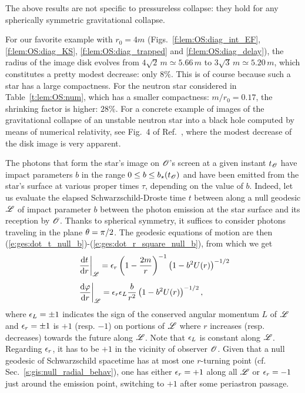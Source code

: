 \begin{remark}
The above results are not specific to pressureless collapse: they
hold for any spherically symmetric gravitational collapse.
\end{remark}

\begin{example}
For our favorite example with $r_0 = 4m$ (Figs.~\ref{f:lem:OS:diag_int_EF},
\ref{f:lem:OS:diag_KS}, \ref{f:lem:OS:diag_trapped} and \ref{f:lem:OS:diag_delay}),
the radius of the image disk evolves from $4\sqrt{2} \, m\simeq 5.66\, m$ to
$3\sqrt{3}\, m \simeq 5.20\, m$, which constitutes a pretty modest
decrease: only $8\%$. This is of course because such a star has a large compactness.
For the neutron star considered in Table~\ref{t:lem:OS:num}, which has a
smaller compactness: $m/r_0 = 0.17$, the shrinking factor is higher: $28\%$.
For a concrete example of images of the gravitational collapse of an unstable neutron star into a black hole computed by means of numerical relativity, see
Fig.~4 of Ref.~\cite{VinceGN12}, where the modest decrease of the disk image
is very apparent.
\end{example}

The photons that form the star's image
on $\mathscr{O}$'s screen at a given instant $t_{\mathscr{O}}$ have impact parameters $b$ in
the range $0\leq b \leq b_\star(t_{\mathscr{O}})$ and have been emitted from the
star's surface at various proper times $\tau$, depending on the value of $b$.
Indeed, let us evaluate the elapsed
Schwarzschild-Droste time $t$ between
along a null geodesic $\mathscr{L}$ of impact parameter $b$ between
the photon emission at the star surface and its reception
by $\mathscr{O}$. Thanks to spherical
symmetry, it suffices to consider photons traveling in the plane
$\theta=\pi/2$. The geodesic equations of motion are then
(\ref{e:ges:dot_t_null_b})-(\ref{e:ges:dot_r_square_null_b}), from which
we get
\begin{subequations}
\begin{align}
   &\left. \frac{\mathrm{d} t}{\mathrm{d} r} \right| _{\mathscr{L}}
    = \epsilon_r \left(1 - \frac{2m}{r} \right) ^{-1}
        \left( 1 - b^2 U(r) \right) ^{-1/2} \\[1ex] \label{e:lem:OS:dtdr_null_geod}
   &\left. \frac{\mathrm{d} \varphi}{\mathrm{d} r} \right| _{\mathscr{L}}
    = \epsilon_r \epsilon_L \frac{b}{r^2} \left( 1 - b^2 U(r) \right) ^{-1/2} ,
\end{align}
\end{subequations}
where
$\epsilon_L = \pm 1$ indicates the sign of the conserved angular momentum $L$
of $\mathscr{L}$ and $\epsilon_r = \pm 1$ is $+1$ (resp. $-1$) on portions of $\mathscr{L}$ where $r$ increases
(resp. decreases) towards the future along $\mathscr{L}$. Note that $\epsilon_L$ is
constant along $\mathscr{L}$. Regarding $\epsilon_r$, it has to be $+1$ in the vicinity
of observer $\mathscr{O}$. Given that a null geodesic of Schwarzschild spacetime
has at most one $r$-turning point (cf. Sec.~\ref{s:gis:null_radial_behav}),
one has either $\epsilon_r = +1$ along all $\mathscr{L}$ or $\epsilon_r = -1$
just around the emission point, switching to $+1$ after some periastron
passage.

